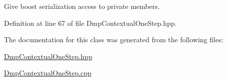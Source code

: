 Give boost serialization access to private members. 



Definition at line 67 of file Dmp\+Contextual\+One\+Step.\+hpp.



The documentation for this class was generated from the following files\+:\begin{DoxyCompactItemize}
\item 
\hyperlink{DmpContextualOneStep_8hpp}{Dmp\+Contextual\+One\+Step.\+hpp}\item 
\hyperlink{DmpContextualOneStep_8cpp}{Dmp\+Contextual\+One\+Step.\+cpp}\end{DoxyCompactItemize}
